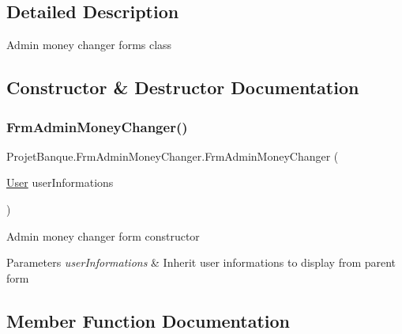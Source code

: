 \subsection{Detailed Description}
Admin money changer form\textquotesingle{}s class 



\subsection{Constructor \& Destructor Documentation}
\mbox{\label{class_projet_banque_1_1_frm_admin_money_changer_a16499d6bd9b74e99da6601daf3f703e5}} 
\subsubsection{\texorpdfstring{FrmAdminMoneyChanger()}{FrmAdminMoneyChanger()}}
{\footnotesize\ttfamily Projet\+Banque.\+Frm\+Admin\+Money\+Changer.\+Frm\+Admin\+Money\+Changer (\begin{DoxyParamCaption}\item[{\mbox{\hyperlink{class_projet_banque_1_1_user}{User}}}]{user\+Informations }\end{DoxyParamCaption})}



Admin money changer form constructor 


\begin{DoxyParams}{Parameters}
{\em user\+Informations} & Inherit user informations to display from parent form\\
\hline
\end{DoxyParams}


\subsection{Member Function Documentation}
\mbox{\label{class_projet_banque_1_1_frm_admin_money_changer_ab9648074593c735c2409f682a20b115e}} 

